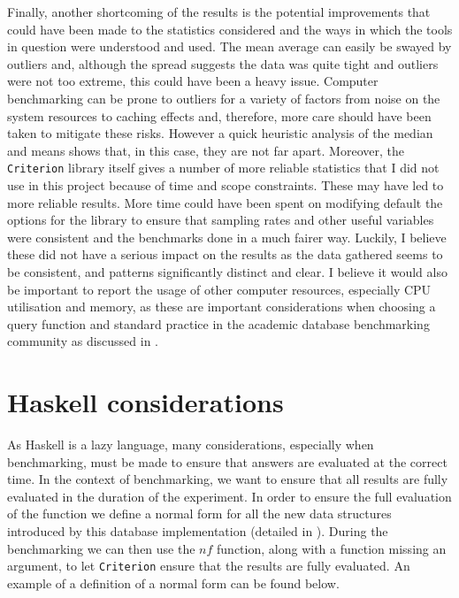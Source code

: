 Finally, another shortcoming of the results is the potential improvements that
could have been made to the statistics considered and the ways in which the tools in
question were understood and used. The mean average can easily be swayed by
outliers and, although the spread suggests the data was quite tight and
outliers were not too extreme, this could have been a heavy issue. Computer
benchmarking can be prone to outliers for a variety of factors from noise on the
system resources to caching effects and, therefore, more care should have been
taken to mitigate these risks. However a quick heuristic analysis of the median
and means shows that, in this case, they are not far apart. Moreover, the
\verb|Criterion| library itself gives a number of more reliable statistics that
I did not use in this project because of time and scope constraints. These may
have led to more reliable results. More time could have been spent on modifying
default the options for the library to ensure that sampling rates and other useful
variables were consistent and the benchmarks done in a much fairer way. Luckily,
I believe these did not have a serious impact on the results as the data
gathered seems to be consistent, and patterns significantly distinct and clear. I
believe it would also be important to report the usage of other computer
resources, especially CPU utilisation and memory, as these are important
considerations when choosing a query function and standard practice in the academic
database benchmarking community as discussed in
.

\section{Haskell considerations}
As Haskell is a lazy language, many considerations, especially when benchmarking,
must be made to ensure that answers are evaluated at the correct time. In the
context of benchmarking, we want to ensure that all results are fully evaluated
in the duration of the experiment. In order to ensure the full evaluation of the
function we define a normal form for all the new data structures introduced by
this database implementation (detailed in ). During the
benchmarking we can then use the $nf$ function, along with a function missing an
argument, to let \verb|Criterion| ensure that the results are fully evaluated.
An example of a definition of a normal form can be found below.



